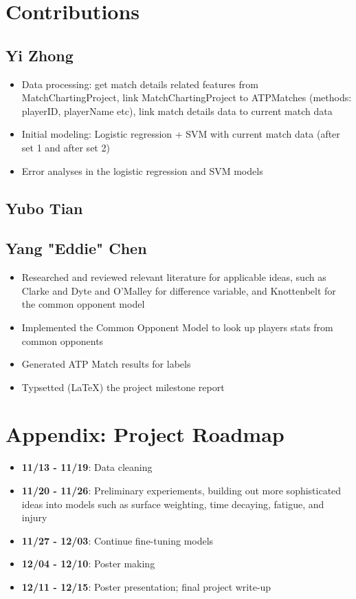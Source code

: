 \documentclass[paper=a4, fontsize=11pt]{scrartcl} %
\numberwithin{equation}{section} %
\numberwithin{figure}{section} %
\numberwithin{table}{section} %
\begin{document}
\appendix

\section{Contributions}
\subsection{Yi Zhong}
\begin{itemize}
\item Data processing: get match details related features from MatchChartingProject, link MatchChartingProject to ATPMatches (methods: playerID, playerName etc), link match details data to current match data
\item Initial modeling: Logistic regression + SVM with current match data (after set 1 and after set 2)
\item Error analyses in the logistic regression and SVM models
\end{itemize}


\subsection{Yubo Tian}
\subsection{Yang "Eddie" Chen}
\begin{itemize}
\item Researched and reviewed relevant literature for applicable ideas, such as Clarke and Dyte \cite{Clarke2010} and O'Malley \cite{omalley} for difference variable, and Knottenbelt \cite{KNOTTENBELT20123820} for the common opponent model
\item Implemented the Common Opponent Model to look up players stats from common opponents
\item Generated ATP Match results for labels
\item Typsetted (\LaTeX) the project milestone report
\end{itemize}

\section{Appendix: Project Roadmap}
\begin{itemize}
\item \textbf{11/13 - 11/19}: Data cleaning
\item \textbf{11/20 - 11/26}: Preliminary experiements, building out more sophisticated ideas into models such as surface weighting, time decaying, fatigue, and injury
\item \textbf{11/27 - 12/03}: Continue fine-tuning models
\item \textbf{12/04 - 12/10}: Poster making
\item \textbf{12/11 - 12/15}: Poster presentation; final project write-up
\end{itemize}
\end{document}
